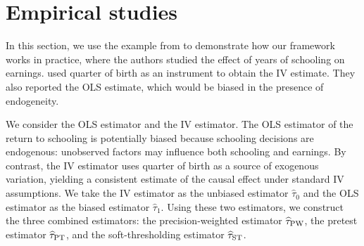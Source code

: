 \documentclass[11pt]{article}
\newcommand{\htau}{\widehat\tau}
\numberwithin{equation}{section}
\theoremstyle{definition}
\begin{document}
\section{Empirical studies}\label{sec:empirical}

In this section, we use the example from \cite{angrist1991does} to demonstrate how our framework works in practice, where the authors studied the effect of years of schooling on earnings. \cite{angrist1991does} used quarter of birth as an instrument to obtain the IV estimate. They also reported the OLS estimate, which would be biased in the presence of endogeneity.



We consider the OLS estimator and the IV estimator. The OLS estimator of the return to schooling is potentially biased because schooling decisions are endogenous: unobserved factors may influence both schooling and earnings. By contrast, the IV estimator uses quarter of birth as a source of exogenous variation, yielding a consistent estimate of the causal effect under standard IV assumptions. We take the IV estimator as the unbiased estimator $\htau_0$ and the OLS estimator as the biased estimator $\htau_1$. Using these two estimators, we construct the three combined estimators: the precision-weighted estimator $\htau_{\rm PW}$, the pretest estimator $\htau_{\rm PT}$, and the soft-thresholding estimator $\htau_{\rm ST}$.
\end{document}
